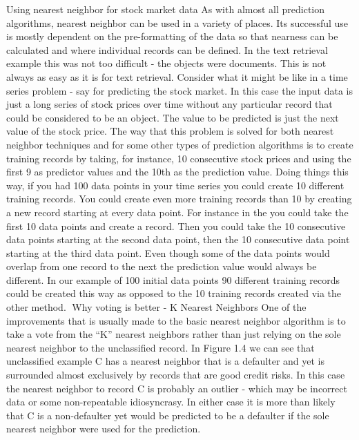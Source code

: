 Using nearest neighbor for stock market data
As with almost all prediction algorithms, nearest neighbor can be used in  a variety of places.  Its successful use is mostly dependent on the pre-formatting of the data so that nearness can be calculated and where individual records can be defined.  In the text retrieval example this was not too difficult - the objects were documents. This is not always as easy as it is for text retrieval. Consider what it might be like in a time series problem - say for predicting the stock market.  In this case the input data is just a long series of stock prices over time without any particular record that could be considered to be an object.   The value to be predicted is just the next value of the stock price.
The way that this problem is solved for both nearest neighbor techniques and for some other types of prediction algorithms is to create training records by taking, for instance, 10 consecutive stock prices and using the first 9 as predictor values and the 10th as the prediction value.  Doing things this way, if you had 100 data points in your time series you could create 10 different training records. 
You could create even more training records than 10 by creating a  new record starting at every data point.  For instance in the you could take the first 10 data points and create a record.  Then you could take the 10 consecutive data points starting at the second data point, then the 10 consecutive data point starting at the third data point.  Even though  some of the data points would overlap from one record to the next the prediction value would always be different.  In our example of 100 initial data points 90 different training records could be created this way as opposed to the 10 training records created via the other method.
Why voting is better - K Nearest Neighbors
One of the improvements that is usually made to the basic nearest neighbor algorithm is to take a vote from the “K” nearest neighbors rather than just relying on the sole nearest neighbor to the unclassified record.  In Figure 1.4 we can see that unclassified example C has a nearest neighbor that is a defaulter and yet is surrounded almost exclusively by records that are good credit risks.  In this case the nearest neighbor to record C is probably an outlier - which may be incorrect data or some non-repeatable idiosyncrasy.  In either case it is more than likely that C is a non-defaulter yet would be predicted to be a defaulter if the sole nearest neighbor were used for the prediction.

